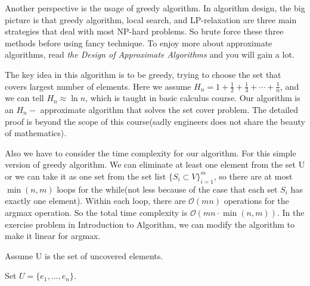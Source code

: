 \documentclass[catalog.tex]{subfiles}
\begin{document}
Another perspective is the usage of greedy algorithm. In algorithm design, the big picture is that greedy algorithm, local search, and LP-relaxation are three main strategies that deal with most NP-hard problems\cite{vg441}. So brute force these three methods before using fancy technique. To enjoy more about approximate algorithms, read \emph{the Design of Approximate Algorithms}\cite{williamson2011design} and you will gain a lot.\newline

The key idea in this algorithm is to be greedy, trying to choose the set that covers largest number of elements. Here we assume $H_{n}=1+\frac{1}{2}+\frac{1}{3}+\cdots+\frac{1}{n}$, and we can tell $H_{n} \approx \ln n$, which is taught in basic calculus course. Our algorithm is an $H_n-$ approximate algorithm that solves the set cover problem. The detailed proof is beyond the scope of this course(sadly engineers does not share the beauty of mathematics).\newline

Also we have to consider the time complexity for our algorithm. For this simple version of greedy algorithm. We can eliminate at least one element from the set U or we can take it as one set from the set list $\{S_i \subset V\}_{i=1}^m$, so there are at most $\min(n, m)$ loops for the while(not less because of the case that each set $S_i$ has exactly one element). Within each loop, there are $\mathcal{O}(mn)$ operations for the argmax operation. So the total time complexity is $\mathcal{O}(mn\cdot \min(n, m))$. In the exercise problem in Introduction to Algorithm, we can modify the algorithm to make it linear for argmax.


\begin{Algorithm}[Greedy Approach\label{alg:\currfilebase}]
	Assume U is the set of uncovered elements. 

	Set $U = \{ e_1, ..., e_n\}$.
	\BlankLine
	\Ret

\end{Algorithm}
\end{document}
